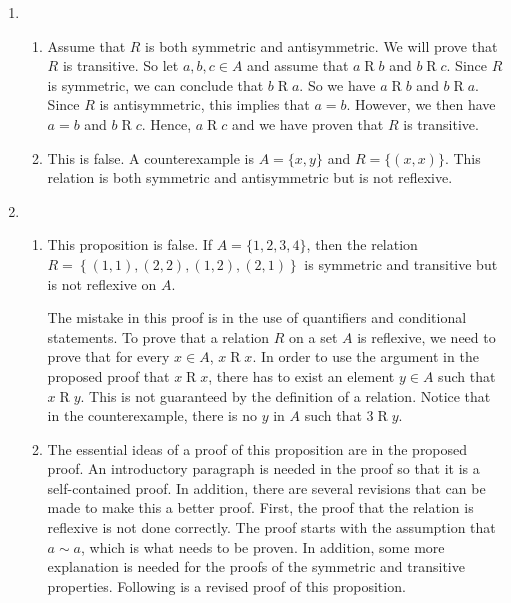\begin{enumerate}
\item \begin{enumerate}
\item Assume that $R$ is both symmetric and antisymmetric.  We will prove that $R$ is transitive.  So let $a, b, c \in A$ and assume that $a \mathrel{R} b$ and 
$b \mathrel{R} c$. Since $R$ is symmetric, we can conclude that $b \mathrel{R} a$.  So we have 
$a \mathrel{R} b$ and $b \mathrel{R} a$.  Since $R$ is antisymmetric, this implies that 
$a = b$.  However, we then have $a = b$ and $b \mathrel{R} c$.  Hence, $a \mathrel{R} c$ and we have proven that $R$ is transitive.

\item This is false.  A counterexample is $A = \{ x, y \}$ and $R = \{ (x, x) \}$.  This relation is both symmetric and antisymmetric but is not reflexive.
\end{enumerate}


\item \begin{enumerate}
\item This proposition is false.  If $A = \{1, 2, 3, 4 \}$, then the relation  
$R  = \left\{ {\left( {1, 1} \right), \left( {2, 2} \right), \left( {1, 2} \right), \left( {2, 1} \right)} \right\}$ is symmetric and transitive but is not reflexive on  
$A$.

\noindent
The mistake in this proof is in the use of quantifiers and conditional statements.  To prove that a relation $R$ on a set $A$ is reflexive, we need to prove that for every $x \in A$, 
$x \mathrel{R} x$.  In order to use the argument in the proposed proof that $x \mathrel{R} x$, there has to exist an element $y \in A$ such that $x \mathrel{R} y$.  This is not guaranteed by the definition of a relation.  Notice that in the counterexample, there is no $y$ in $A$ such that $3 \mathrel{R} y$.

\item The essential ideas of a proof of this proposition are in the proposed proof.  An introductory paragraph is needed in the proof so that it is a self-contained proof.  In addition, there are several revisions that can be made to make this a better proof.  First, the proof that the relation is reflexive is not done correctly.  The proof starts with the assumption that $a \sim a$, which is what needs to be proven.  In addition, some more explanation is needed for the proofs of the symmetric and transitive properties.  Following is a revised proof of this proposition.


\end{enumerate}
\end{enumerate}
